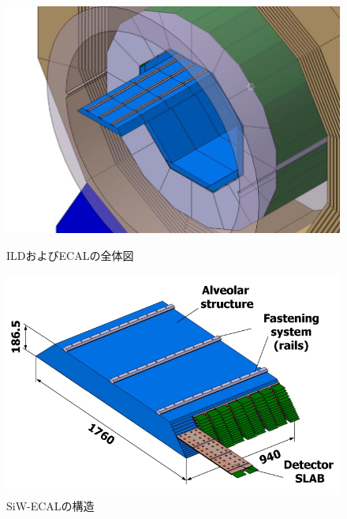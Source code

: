 \begin{figure}[h]
 \begin{minipage}[h]{.45\linewidth}
	\begin{center}
 \includegraphics[keepaspectratio, scale=0.8]
 	{Figure/Siwecal/ECAL.png}
 		\caption{ILDおよびECALの全体図}
 		\label{ECAL}
	\end{center}
\end{minipage}
\hfill
\begin{minipage}[h]{.45\linewidth}
	\begin{center}
 \includegraphics[keepaspectratio, scale=0.8]
 	{Figure/Siwecal/SiW-ECAL.png}
 		\caption{SiW-ECALの構造}
 		\label{SiW-ECAL}
	\end{center}
\end{minipage}
\end{figure}

